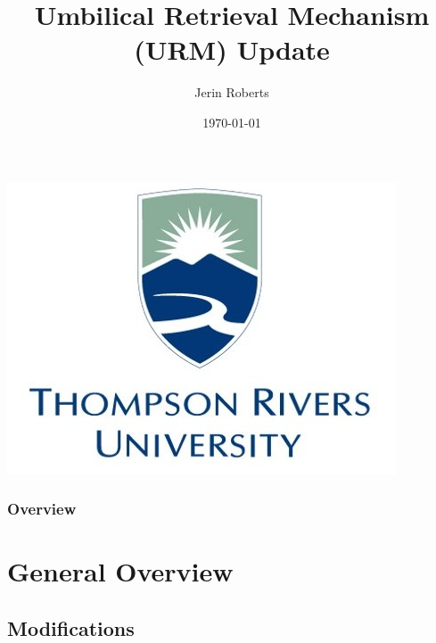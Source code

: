 \documentclass{beamer}
\title[URM]{Umbilical Retrieval Mechanism (URM) Update} %
\author{Jerin Roberts} %
\institute[TRU] %
{
 
\textit{robertsj@snolab.ca} \\

}
\date{\today} %
\begin{document}
\begin{frame}
\centering
\includegraphics[width=0.15\linewidth]{tru}
\titlepage %
\end{frame}

\begin{frame}
\frametitle{Overview} %
\tableofcontents %
\end{frame}


\section{General Overview} %

\subsection{Modifications} %
\end{document}
